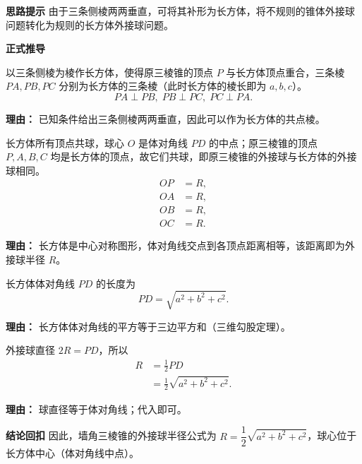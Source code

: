 \begin{proofbox}
	\textbf{\textcolor{CProof}{思路提示}}
	由于三条侧棱两两垂直，可将其补形为长方体，将不规则的锥体外接球问题转化为规则的长方体外接球问题。

	\medskip
	\textbf{\textcolor{CProof}{正式推导}}
	\begin{description}[style=nextline, leftmargin=2.8em, labelsep=0.5em, itemsep=0.55em]
		\item[\textbf{步骤一（补形操作）：}]
			以三条侧棱为棱作长方体，使得原三棱锥的顶点 $P$ 与长方体顶点重合，三条棱 $PA,PB,PC$ 分别为长方体的三条棱（此时长方体的棱长即为 $a,b,c$）。
			\[
				PA \perp PB,\; PB \perp PC,\; PC \perp PA.
			\]
			\par\textbf{理由：} 已知条件给出三条侧棱两两垂直，因此可以作为长方体的共点棱。
		\item[\textbf{步骤二（球的等价性）：}]
			长方体所有顶点共球，球心 $O$ 是体对角线 $PD$ 的中点；原三棱锥的顶点 $P,A,B,C$ 均是长方体的顶点，故它们共球，即原三棱锥的外接球与长方体的外接球相同。
			\[
				\begin{aligned}
					OP &= R, \\ OA &= R, \\ OB &= R, \\ OC &= R.
			\end{aligned}
			\]
			\par\textbf{理由：} 长方体是中心对称图形，体对角线交点到各顶点距离相等，该距离即为外接球半径 $R$。
		\item[\textbf{步骤三（体对角线长度）：}]
			长方体体对角线 $PD$ 的长度为
			\[
				PD = \sqrt{a^{2}+b^{2}+c^{2}}.
			\]
			\par\textbf{理由：} 长方体体对角线的平方等于三边平方和（三维勾股定理）。
		\item[\textbf{步骤四（导出半径）：}]
			外接球直径 $2R = PD$，所以
			\[
				\begin{aligned}
					R &= \frac{1}{2}PD \\ &= \frac{1}{2}\sqrt{a^{2}+b^{2}+c^{2}}.
			\end{aligned}
			\]
			\par\textbf{理由：} 球直径等于体对角线；代入即可。
	\end{description}

	\medskip
	\textbf{\textcolor{CProof}{结论回扣}}
	因此，墙角三棱锥的外接球半径公式为 $R = \dfrac12\sqrt{a^{2}+b^{2}+c^{2}}$，球心位于长方体中心（体对角线中点）。
\end{proofbox}
